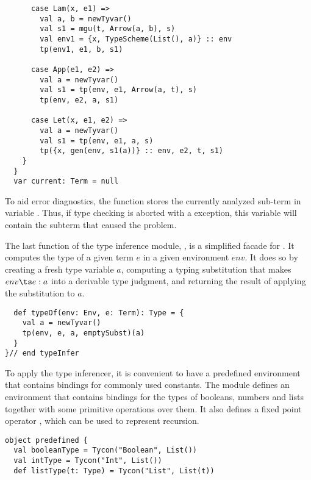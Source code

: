 {\begin{lstlisting}
      case Lam(x, e1) =>
        val a, b = newTyvar()
        val s1 = mgu(t, Arrow(a, b), s)
        val env1 = {x, TypeScheme(List(), a)} :: env
        tp(env1, e1, b, s1)

      case App(e1, e2) =>
        val a = newTyvar()
        val s1 = tp(env, e1, Arrow(a, t), s)
        tp(env, e2, a, s1)

      case Let(x, e1, e2) =>
        val a = newTyvar()
        val s1 = tp(env, e1, a, s)
        tp({x, gen(env, s1(a))} :: env, e2, t, s1)
    }
  } 
  var current: Term = null
\end{lstlisting}
To aid error diagnostics, the  function stores the currently
analyzed sub-term in variable . Thus, if type checking
is aborted with a  exception, this variable will
contain the subterm that caused the problem.

The last function of the type inference module, , is a
simplified facade for . It computes the type of a given term
$e$ in a given environment $env$. It does so by creating a fresh type
variable $a$, computing a typing substitution that makes $env \ts e: a$
into a derivable type judgment, and returning
the result of applying the substitution to $a$.
\begin{lstlisting}
  def typeOf(env: Env, e: Term): Type = {
    val a = newTyvar()
    tp(env, e, a, emptySubst)(a)
  }
}// end typeInfer
\end{lstlisting}
To apply the type inferencer, it is convenient to have a predefined
environment that contains bindings for commonly used constants. The
module  defines an environment  that
contains bindings for the types of booleans, numbers and lists
together with some primitive operations over them. It also
defines a fixed point operator , which can be used to
represent recursion.
\begin{lstlisting}
object predefined {
  val booleanType = Tycon("Boolean", List())
  val intType = Tycon("Int", List())
  def listType(t: Type) = Tycon("List", List(t))


\end{lstlisting}}
